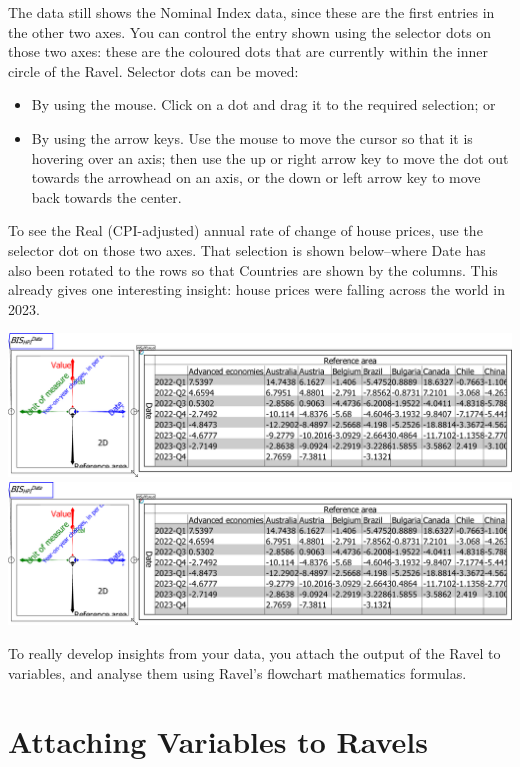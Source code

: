 The data still shows the Nominal Index data, since these are the first entries in the other two axes. You can control the entry shown using the selector dots on those two axes: these are the coloured dots that are currently within the inner circle of the Ravel. Selector dots can be moved:

\begin{itemize}
\item By using the mouse. Click on a dot and drag it to the required selection; or
\item By using the arrow keys. Use the mouse to move the cursor so that it is hovering over an axis; then use the up or right arrow key to move the dot out towards the arrowhead on an axis, or the down or left arrow key to move back towards the center.
\end{itemize}

To see the Real (CPI-adjusted) annual rate of change of house prices, use the selector dot on those two axes. That selection is shown below--where Date has also been rotated to the rows so that Countries are shown by the columns. This already gives one interesting insight: house prices were falling across the world in 2023.

\includegraphics{images/tut04HPI4DwithSheetRotatedCountryDateRealChange.eps}
\includegraphics{images/tut04HPI4DwithSheetRotatedCountryDateRealChange.eps}

To really develop insights from your data, you attach the output of the Ravel to variables, and analyse them using Ravel's flowchart mathematics formulas.

\section{Attaching Variables to Ravels}

